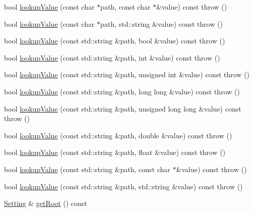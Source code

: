 \begin{DoxyCompactItemize}
\item 
bool \hyperlink{classlibconfig_1_1_config_a0934a631059747bd570ced12f9d19ba7}{lookupValue} (const char $\ast$path, const char $\ast$\&value) const   throw ()
\item 
bool \hyperlink{classlibconfig_1_1_config_a09f19c13ff6e85b86479e43b3d269e36}{lookupValue} (const char $\ast$path, std::string \&value) const   throw ()
\item 
bool \hyperlink{classlibconfig_1_1_config_aefdd467e6bfc1caf66337155e762fa59}{lookupValue} (const std::string \&path, bool \&value) const   throw ()
\item 
bool \hyperlink{classlibconfig_1_1_config_ae081df5d2ecb0c67b02dd0e72464a159}{lookupValue} (const std::string \&path, int \&value) const   throw ()
\item 
bool \hyperlink{classlibconfig_1_1_config_aeb906407ffb13dc17abc75284bf625e0}{lookupValue} (const std::string \&path, unsigned int \&value) const   throw ()
\item 
bool \hyperlink{classlibconfig_1_1_config_abac0ebba041f793bd7f0fdf4b118b22f}{lookupValue} (const std::string \&path, long long \&value) const   throw ()
\item 
bool \hyperlink{classlibconfig_1_1_config_a891a38318bcdea1ea8f17c68e1c928a0}{lookupValue} (const std::string \&path, unsigned long long \&value) const   throw ()
\item 
bool \hyperlink{classlibconfig_1_1_config_ac4d63696452375134a8a33aa9137e8ad}{lookupValue} (const std::string \&path, double \&value) const   throw ()
\item 
bool \hyperlink{classlibconfig_1_1_config_abd86ae4d09edafb2d79a4656b99c9433}{lookupValue} (const std::string \&path, float \&value) const   throw ()
\item 
bool \hyperlink{classlibconfig_1_1_config_a5087522213b6c2b2b658c6d1fdbe21dd}{lookupValue} (const std::string \&path, const char $\ast$\&value) const   throw ()
\item 
bool \hyperlink{classlibconfig_1_1_config_acbe75986295275d5beb1b6e54bd80554}{lookupValue} (const std::string \&path, std::string \&value) const   throw ()
\item 
\hyperlink{classlibconfig_1_1_setting}{Setting} \& \hyperlink{classlibconfig_1_1_config_a10e517e0d174ce21141b9d24b1b2c5db}{getRoot} () const 
\end{DoxyCompactItemize}


